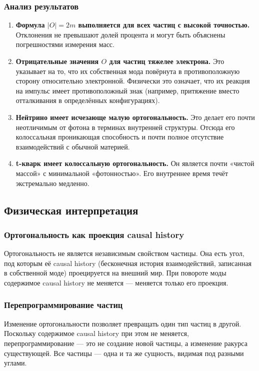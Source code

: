 \documentclass[12pt,a4paper]{article}
\begin{document}
\subsubsection{Анализ результатов}
\begin{enumerate}[label=\arabic*.]
    \item \textbf{Формула $|O| = 2m$ выполняется для всех частиц с высокой точностью.} Отклонения не превышают долей процента и могут быть объяснены погрешностями измерения масс.
    \item \textbf{Отрицательные значения $O$ для частиц тяжелее электрона.} Это указывает на то, что их собственная мода повёрнута в противоположную сторону относительно электронной. Физически это означает, что их реакция на импульс имеет противоположный знак (например, притяжение вместо отталкивания в определённых конфигурациях).
    \item \textbf{Нейтрино имеет исчезающе малую ортогональность.} Это делает его почти неотличимым от фотона в терминах внутренней структуры. Отсюда его колоссальная проникающая способность и почти полное отсутствие взаимодействий с обычной материей.
    \item \textbf{t-кварк имеет колоссальную ортогональность.} Он является почти «чистой массой» с минимальной «фотонностью». Его внутреннее время течёт экстремально медленно.
\end{enumerate}

\subsection{Физическая интерпретация}

\subsubsection{Ортогональность как проекция causal history}
Ортогональность не является независимым свойством частицы. Она есть угол, под которым её causal history (бесконечная история взаимодействий, записанная в собственной моде) проецируется на внешний мир. При повороте моды содержимое causal history не меняется --- меняется только его проекция.

\subsubsection{Перепрограммирование частиц}
Изменение ортогональности позволяет превращать один тип частиц в другой. Поскольку содержимое causal history при этом не меняется, перепрограммирование --- это не создание новой частицы, а изменение ракурса существующей. Все частицы --- одна и та же сущность, видимая под разными углами.
\end{document}
